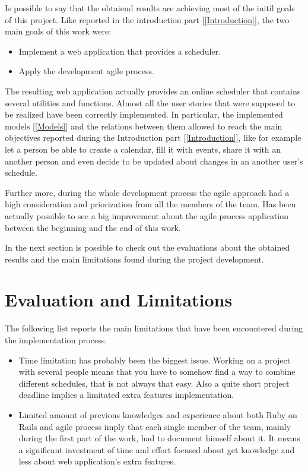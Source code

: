 Is possible to say that the obtaiend results are achieving most of the initil goals of this project. 
Like reported in the introduction part [\ref{Introduction}], the two main goals of this work were:\vspace{-2mm}
\begin{itemize}
 \item Implement a web application that provides a scheduler.
 \item Apply the development agile process.
\end{itemize}

The resulting web application actually provides an online scheduler that contains several utilities and functions. Almost all the user stories that were supposed to be realized have been correctly implemented. In particular, the implemented models [\ref{Models}] and the relations between them allowed to reach the main objectives reported during the Introduction part [\ref{Introduction}], like for example let a person be able to create a calendar, fill it with events, share it with an another person and even decide to be updated about changes in an another user's schedule.

Further more, during the whole development process the agile approach had a high consideration and priorization from all the members of the team. Has been actually possible to see a big improvement about the agile process application between the beginning and the end of this work.

In the next section is possible to check out the evaluations about the obtained results and the main limitations found during the project development.
\newpage

\section{Evaluation and Limitations}
\vspace{-5mm}
\label{Evaluation}
The following list reports the main limitations that have been encountered during the implementation process.
\vspace{-5mm}
\begin{itemize}
\item Time limitation has probably been the biggest issue. Working on a project with several people means that you have to somehow find a way to combine different schedules, that is not always that easy. Also a quite short project deadline implies a limitated extra features implementation.
\item Limited amount of previous knowledges and experience about both Ruby on Rails and agile process imply that each single member of the team, mainly during the first part of the work, had to document himself about it. It means a significant investment of time and effort focused about get knowledge and less about web application's extra features. 
\end{itemize}

